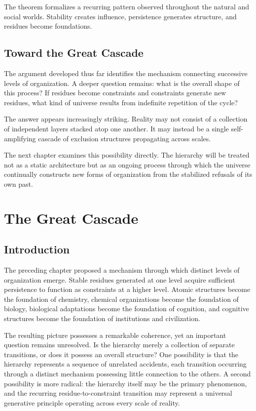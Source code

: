 \documentclass[11pt,oneside]{book}
\theoremstyle{plain}
\theoremstyle{definition}
\theoremstyle{remark}
\begin{document}
The theorem formalizes a recurring pattern observed throughout the natural and social worlds. Stability creates influence, persistence generates structure, and residues become foundations.

\section{Toward the Great Cascade}

The argument developed thus far identifies the mechanism connecting successive levels of organization. A deeper question remains: what is the overall shape of this process? If residues become constraints and constraints generate new residues, what kind of universe results from indefinite repetition of the cycle?

The answer appears increasingly striking. Reality may not consist of a collection of independent layers stacked atop one another. It may instead be a single self-amplifying cascade of exclusion structures propagating across scales.

The next chapter examines this possibility directly. The hierarchy will be treated not as a static architecture but as an ongoing process through which the universe continually constructs new forms of organization from the stabilized refusals of its own past.

\chapter{The Great Cascade}

\section{Introduction}

The preceding chapter proposed a mechanism through which distinct levels of organization emerge. Stable residues generated at one level acquire sufficient persistence to function as constraints at a higher level. Atomic structures become the foundation of chemistry, chemical organizations become the foundation of biology, biological adaptations become the foundation of cognition, and cognitive structures become the foundation of institutions and civilization.

The resulting picture possesses a remarkable coherence, yet an important question remains unresolved. Is the hierarchy merely a collection of separate transitions, or does it possess an overall structure? One possibility is that the hierarchy represents a sequence of unrelated accidents, each transition occurring through a distinct mechanism possessing little connection to the others. A second possibility is more radical: the hierarchy itself may be the primary phenomenon, and the recurring residue-to-constraint transition may represent a universal generative principle operating across every scale of reality.
\end{document}
